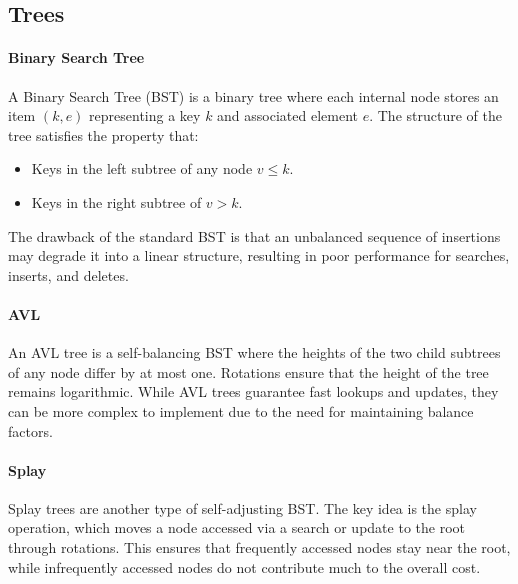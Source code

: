 \subsection{Trees}
\paragraph*{Binary Search Tree}
A Binary Search Tree (BST) is a binary tree where each internal node stores an item $(k, e)$ representing a key $k$ and associated element $e$. 
The structure of the tree satisfies the property that: 
\begin{itemize} 
    \item Keys in the left subtree of any node $v\leq k$. 
    \item Keys in the right subtree of $v>k$. 
\end{itemize}
The drawback of the standard BST is that an unbalanced sequence of insertions may degrade it into a linear structure, resulting in poor performance for searches, inserts, and deletes.

\paragraph*{AVL}
An AVL tree is a self-balancing BST where the heights of the two child subtrees of any node differ by at most one. 
Rotations ensure that the height of the tree remains logarithmic. 
While AVL trees guarantee fast lookups and updates, they can be more complex to implement due to the need for maintaining balance factors.

\paragraph*{Splay}
Splay trees are another type of self-adjusting BST.
The key idea is the splay operation, which moves a node accessed via a search or update to the root through rotations. 
This ensures that frequently accessed nodes stay near the root, while infrequently accessed nodes do not contribute much to the overall cost.